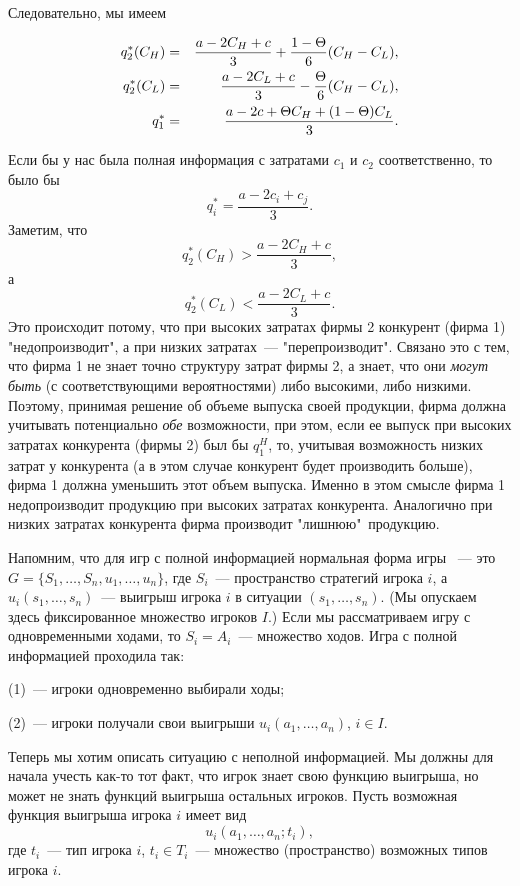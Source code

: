 \noindent
Следовательно, мы имеем
\begin{center}
\begin{eqnarray}
q_2^*(C_H)&=&{{a-2{C_H}+c}\over 3}+{1-\Theta\over 6}(C_H-C_L),\nonumber\\
q_2^*(C_L)&=&{{a-2{C_L}+c}\over 3}-{\Theta\over 6}(C_H-C_L),\nonumber\\
q_1^*&=&{\frac{a-2c+\Theta C_H+(1-\Theta)C_L}{3}}.\nonumber
\end{eqnarray}
\end{center}
\noindent
Если бы у нас была полная информация с затратами $c_1$ и $c_2$
соответственно, то было бы $$ q^*_i={\frac{a-2c_i+c_j}{3}}.
$$
Заметим, что
$$
q^*_2(C_H)>{\frac{a-2C_H+c}{3}},
$$
а
$$
q^*_2(C_L)<{\frac{a-2C_L+c}{3}}.
$$
Это происходит потому, что при высоких затратах фирмы 2 конкурент (фирма 1)
"недопроизводит", а при низких затратах~--- "перепроизводит".
Связано это с тем, что фирма 1 не знает
точно структуру затрат фирмы 2, а знает, что они {\it могут быть}
(с соответствующими вероятностями) либо высокими, либо низкими.
Поэтому, принимая решение об объеме выпуска своей продукции, фирма
должна учитывать потенциально {\it обе} возможности, при этом, если
ее выпуск при высоких затратах конкурента (фирмы 2) был бы $q^H_1$,
то, учитывая возможность низких затрат у конкурента (а в этом случае
конкурент будет производить больше), фирма 1 должна
уменьшить этот объем выпуска. Именно в этом смысле фирма 1
недопроизводит продукцию при высоких затратах конкурента. Аналогично
при низких затратах конкурента фирма производит "лишнюю"\,
продукцию.

Напомним, что для игр с полной информацией нормальная форма игры ~--- это
$G=\{S_1,\ldots,S_n,u_1,\ldots,u_n\}$, где $S_i$~--- пространство
стратегий игрока $i$, а $u_i(s_1,\ldots,s_n)$~--- выигрыш игрока $i$ в
ситуации $(s_1,\ldots,s_n)$. (Мы опускаем здесь фиксированное множество
игроков $I$.) Если мы рассматриваем игру с одновременными ходами,
то $S_i=A_i$~--- множество ходов. Игра с полной информацией проходила так:

(1)~--- игроки одновременно выбирали ходы;

(2)~--- игроки получали свои выигрыши $u_i(a_1,\ldots,a_n)$, $i\in I$.

Теперь мы хотим описать ситуацию с неполной информацией. Мы
должны для начала учесть как-то тот факт, что игрок знает свою
функцию выигрыша, но может не знать функций выигрыша остальных
игроков. Пусть возможная функция выигрыша игрока $i$ имеет вид
$$
u_i(a_1,\ldots,a_n;t_i),
$$
где $t_i$~--- тип игрока $i$, $t_i\in T_i$~--- множество (пространство)
возможных типов игрока $i$.

